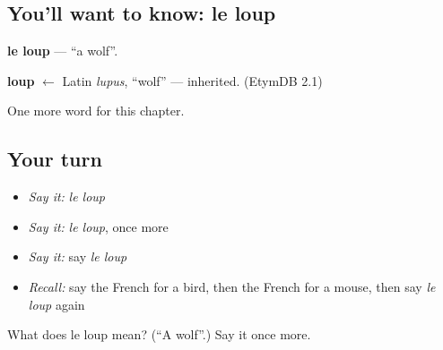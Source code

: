 \subsection*{You'll want to know: le loup}
\textbf{le loup} — \textquotedblleft{}a wolf\textquotedblright{}.

\begin{cousinweb}
\textbf{loup} $\leftarrow$ Latin \emph{lupus}, \textquotedblleft{}wolf\textquotedblright{} — inherited. (EtymDB 2.1)
\end{cousinweb}

\begin{grammarlens}[title={What you've built}]
One more word for this chapter.
\end{grammarlens}

\subsection*{Your turn}
\begin{itemize}
\raggedright
  \item \emph{Say it:} \emph{le loup}
  \item \emph{Say it:} \emph{le loup}, once more
  \item \emph{Say it:} say \emph{le loup}
  \item \emph{Recall:} say the French for a bird, then the French for a mouse, then say \emph{le loup} again
\end{itemize}

\begin{tcolorbox}[breakable,colback=teal!4,colframe=teal!35!black,title={Before you move on}]
What does le loup mean? (\textquotedblleft{}A wolf\textquotedblright{}.) Say it once more.
\end{tcolorbox}

